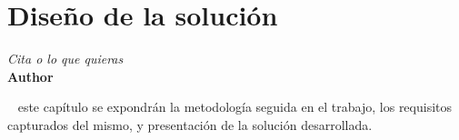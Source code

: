\chapter{Diseño de la solución}

\vspace{-0.5cm}

\begin{flushright}
  \emph{\guillemotleft Cita o lo que quieras\guillemotright}\\ \textbf{Author}
\end{flushright}
\hyphenation{}
\grayMinitoc

\parindent=16mm

~ este capítulo se expondrán la metodología seguida en el trabajo, los requisitos capturados del mismo, y presentación de la solución desarrollada.


